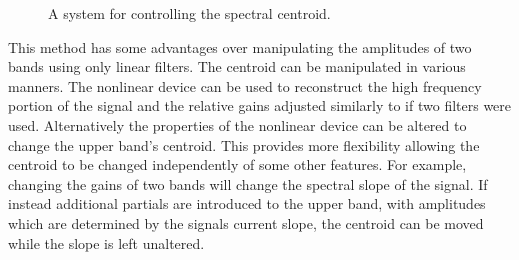 			\begin{figure}[h!]
				\centering
				\caption{A system for controlling the spectral centroid.}
				\label{fig:TwoBandSpectralCentroidSystem}
			\end{figure}

			This method has some advantages over manipulating the amplitudes of two bands using only linear
			filters. The centroid can be manipulated in various manners. The nonlinear device can be used to
			reconstruct the high frequency portion of the signal and the relative gains adjusted similarly to
			if two filters were used.  Alternatively the properties of the nonlinear device can be altered to
			change the upper band's centroid. This provides more flexibility allowing the centroid to be
			changed independently of some other features. For example, changing the gains of two bands will
			change the spectral slope of the signal. If instead additional partials are introduced to the upper
			band, with amplitudes which are determined by the signals current slope, the centroid can be moved
			while the slope is left unaltered.

